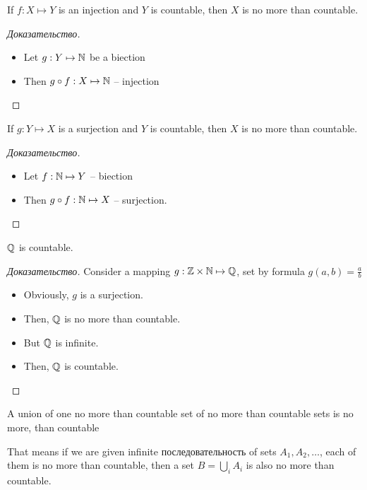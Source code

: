 \begin{corollary}[]
	If $f: X \mapsto Y$ is an injection and $Y$ is countable, then $X$ is no more than countable.
\end{corollary}

\begin{proof}[Доказательство]
	\begin{itemize}
		\item Let $g: Y \mapsto \mathbb{N}$ be a biection
		\item Then $g \circ f: X \mapsto \mathbb{N}$ -- injection 
	\end{itemize}
\end{proof}

\begin{corollary}[]
	If $g: Y \mapsto X$ is a surjection and $Y$ is countable, then $X$ is no more than countable.
\end{corollary}

\begin{proof}[Доказательство]
	\begin{itemize}
		\item Let $f: \mathbb{N} \mapsto Y$ -- biection
		\item Then $g \circ f: \mathbb{N} \mapsto X$ -- surjection. 
	\end{itemize}
\end{proof}

\begin{theorem}[]
	$\mathbb{Q}$ is countable.
\end{theorem}

\begin{proof}[Доказательство]
	Consider a mapping $g: \mathbb{Z} \times \mathbb{N} \mapsto \mathbb{Q}$, set by formula $g(a,b) = \frac{a}{b}$ 
	\begin{itemize}
		\item Obviously, $g$ is a surjection.
		\item Then, $\mathbb{Q}$ is no more than countable.
		\item But $\mathbb{Q}$ is infinite.
		\item Then, $\mathbb{Q}$ is countable. 
	\end{itemize}
\end{proof}

\begin{theorem}[]
	A union of one no more than countable set of no more than countable sets is no more, than countable
\end{theorem}

\begin{note}[]
	That means if we are given infinite последовательность of sets $A_1, A_2, \dots $, each of them is no more than countable, then a set $B = \bigcup_{i} A_i$ is also no more than countable.
\end{note}

